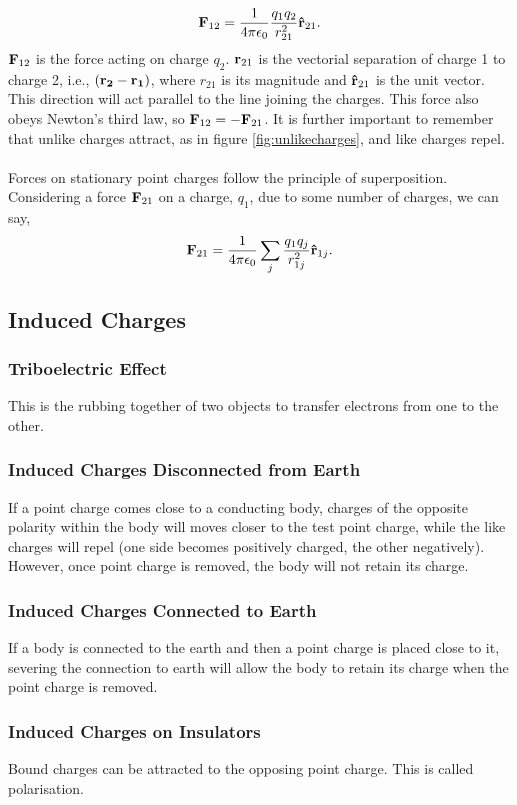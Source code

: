 \documentclass{book}
\begin{document}
\begin{equation}
    \vb{F}_{12} = \frac{1}{4\pi\epsilon_0}\frac{q_1q_2}{r_{21}^2}\vu{r}_{21}. 
\end{equation}
$\vb{F}_{12}$ is the force acting on charge $q_2$. $\vb{r}_{21}$ is the vectorial separation of charge 1 to charge 2, i.e., $(\vb{r_2} - \vb{r_1})$, where $r_{21}$ is its magnitude and $\vu{r}_{21}$ is the unit vector. This direction will act parallel to the line joining the charges. This force also obeys Newton's third law, so $\vb{F}_{12} = -\vb{F}_{21}$. It is further important to remember that unlike charges attract, as in figure \ref{fig:unlikecharges}, and like charges repel. 
\\\\
Forces on stationary point charges follow the principle of superposition. Considering a force $\vb{F}_{21}$ on a charge, $q_1$, due to some number of charges, we can say,
\begin{equation}
    \vb{F}_{21} = \frac{1}{4\pi\epsilon_0}\sum_j\frac{q_1q_j}{r_{1j}^2}\vu{r}_{1j}.
\end{equation}
\subsection{Induced Charges}
\subsubsection{Triboelectric Effect}
This is the rubbing together of two objects to transfer electrons from one to the other. 
\subsubsection{Induced Charges Disconnected from Earth}
If a point charge comes close to a conducting body, charges of the opposite polarity within the body will moves closer to the test point charge, while the like charges will repel (one side becomes positively charged, the other negatively). However, once point charge is removed, the body will not retain its charge.
\subsubsection{Induced Charges Connected to Earth}
If a body is connected to the earth and then a point charge is placed close to it, severing the connection to earth will allow the body to retain its charge when the point charge is removed.
\subsubsection{Induced Charges on Insulators}
Bound charges can be attracted to the opposing point charge. This is called polarisation.
\end{document}
